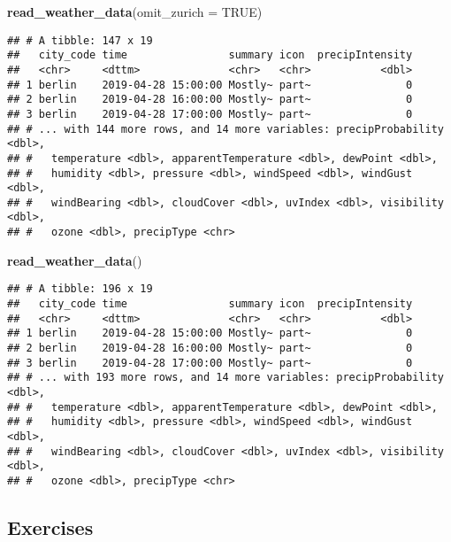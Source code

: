 \documentclass[]{book}
\newenvironment{Shaded}{\begin{snugshade}}{\end{snugshade}}
\newcommand{\DataTypeTok}[1]{\textcolor[rgb]{0.13,0.29,0.53}{#1}}
\newcommand{\KeywordTok}[1]{\textcolor[rgb]{0.13,0.29,0.53}{\textbf{#1}}}
\newcommand{\NormalTok}[1]{#1}
\newcommand{\OtherTok}[1]{\textcolor[rgb]{0.56,0.35,0.01}{#1}}
\begin{document}
\begin{Shaded}
\begin{Highlighting}[]
\KeywordTok{read_weather_data}\NormalTok{(}\DataTypeTok{omit_zurich =} \OtherTok{TRUE}\NormalTok{)}
\end{Highlighting}
\end{Shaded}

\begin{verbatim}
## # A tibble: 147 x 19
##   city_code time                summary icon  precipIntensity
##   <chr>     <dttm>              <chr>   <chr>           <dbl>
## 1 berlin    2019-04-28 15:00:00 Mostly~ part~               0
## 2 berlin    2019-04-28 16:00:00 Mostly~ part~               0
## 3 berlin    2019-04-28 17:00:00 Mostly~ part~               0
## # ... with 144 more rows, and 14 more variables: precipProbability <dbl>,
## #   temperature <dbl>, apparentTemperature <dbl>, dewPoint <dbl>,
## #   humidity <dbl>, pressure <dbl>, windSpeed <dbl>, windGust <dbl>,
## #   windBearing <dbl>, cloudCover <dbl>, uvIndex <dbl>, visibility <dbl>,
## #   ozone <dbl>, precipType <chr>
\end{verbatim}

\begin{Shaded}
\begin{Highlighting}[]
\KeywordTok{read_weather_data}\NormalTok{()}
\end{Highlighting}
\end{Shaded}

\begin{verbatim}
## # A tibble: 196 x 19
##   city_code time                summary icon  precipIntensity
##   <chr>     <dttm>              <chr>   <chr>           <dbl>
## 1 berlin    2019-04-28 15:00:00 Mostly~ part~               0
## 2 berlin    2019-04-28 16:00:00 Mostly~ part~               0
## 3 berlin    2019-04-28 17:00:00 Mostly~ part~               0
## # ... with 193 more rows, and 14 more variables: precipProbability <dbl>,
## #   temperature <dbl>, apparentTemperature <dbl>, dewPoint <dbl>,
## #   humidity <dbl>, pressure <dbl>, windSpeed <dbl>, windGust <dbl>,
## #   windBearing <dbl>, cloudCover <dbl>, uvIndex <dbl>, visibility <dbl>,
## #   ozone <dbl>, precipType <chr>
\end{verbatim}

\hypertarget{exercises-3}{%
\subsection{Exercises}\label{exercises-3}}
\end{document}
